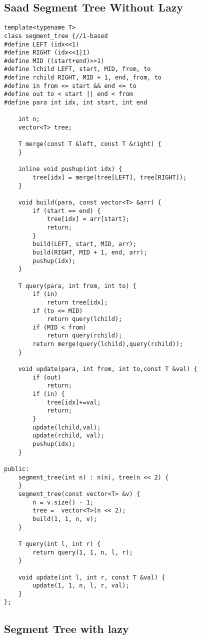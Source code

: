 \subsection{Saad Segment Tree Without Lazy}

\begin{lstlisting}[style=cpp]
template<typename T>
class segment_tree {//1-based
#define LEFT (idx<<1)
#define RIGHT (idx<<1|1)
#define MID ((start+end)>>1)
#define lchild LEFT, start, MID, from, to
#define rchild RIGHT, MID + 1, end, from, to
#define in from <= start && end <= to
#define out to < start || end < from
#define para int idx, int start, int end

    int n;
    vector<T> tree;

    T merge(const T &left, const T &right) {
    }
    
    inline void pushup(int idx) {
        tree[idx] = merge(tree[LEFT], tree[RIGHT]);
    }
    
    void build(para, const vector<T> &arr) {
        if (start == end) {
            tree[idx] = arr[start];
            return;
        }
        build(LEFT, start, MID, arr);
        build(RIGHT, MID + 1, end, arr);
        pushup(idx);
    }

    T query(para, int from, int to) {
        if (in)
            return tree[idx];
        if (to <= MID)
            return query(lchild);
        if (MID < from)
            return query(rchild);
        return merge(query(lchild),query(rchild));
    }

    void update(para, int from, int to,const T &val) {
        if (out)
            return;
        if (in) {
            tree[idx]+=val; 
            return;
        }
        update(lchild,val);
        update(rchild, val);
        pushup(idx);
    }

public:
    segment_tree(int n) : n(n), tree(n << 2) {
    }
    segment_tree(const vector<T> &v) {
        n = v.size() - 1;
        tree =  vector<T>(n << 2);
        build(1, 1, n, v);
    }

    T query(int l, int r) {
        return query(1, 1, n, l, r);
    }

    void update(int l, int r, const T &val) {
        update(1, 1, n, l, r, val);
    }
};
\end{lstlisting}

\subsection{Segment Tree with lazy}

